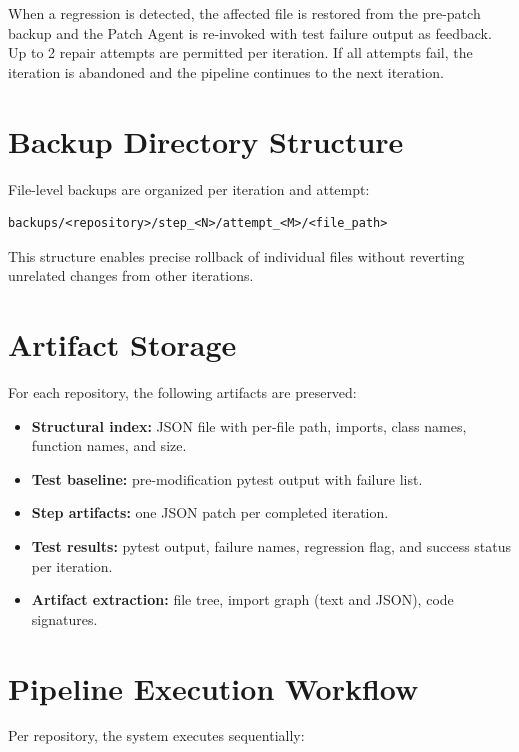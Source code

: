 When a regression is detected, the affected file is restored from the pre-patch backup and the Patch Agent is re-invoked with test failure output as feedback. Up to 2 repair attempts are permitted per iteration. If all attempts fail, the iteration is abandoned and the pipeline continues to the next iteration.

\section{Backup Directory Structure}

File-level backups are organized per iteration and attempt:

\begin{verbatim}
backups/<repository>/step_<N>/attempt_<M>/<file_path>
\end{verbatim}

This structure enables precise rollback of individual files without reverting unrelated changes from other iterations.

\section{Artifact Storage}

For each repository, the following artifacts are preserved:

\begin{itemize}
    \item \textbf{Structural index:} JSON file with per-file path, imports, class names, function names, and size.
    \item \textbf{Test baseline:} pre-modification pytest output with failure list.
    \item \textbf{Step artifacts:} one JSON patch per completed iteration.
    \item \textbf{Test results:} pytest output, failure names, regression flag, and success status per iteration.
    \item \textbf{Artifact extraction:} file tree, import graph (text and JSON), code signatures.
\end{itemize}

\section{Pipeline Execution Workflow}

Per repository, the system executes sequentially:

